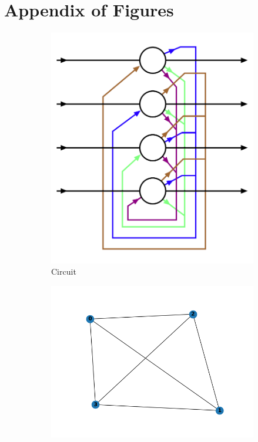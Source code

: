 \documentclass[11pt]{article}
\begin{document}
	\pagebreak
	\section*{Appendix of Figures}
	
	\begin{figure}[h]
	\begin{center}
	\begin{subfigure}{0.4\textwidth}
		\includegraphics[width=0.95\linewidth]{../img/hopfieldnet.png}
	\caption{Circuit}
	\label{fig:netcircuit}
	\end{subfigure}
	\begin{subfigure}{0.4\textwidth}
		\includegraphics[width=0.95\linewidth]{../img/hopfieldgraph_undirected.png}

\end{subfigure}
\end{center}
\end{figure}
\end{document}
